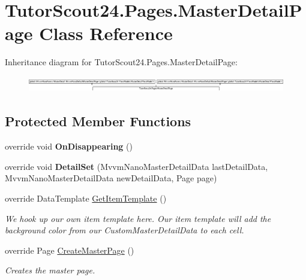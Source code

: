 \hypertarget{class_tutor_scout24_1_1_pages_1_1_master_detail_page}{}\section{Tutor\+Scout24.\+Pages.\+Master\+Detail\+Page Class Reference}
\label{class_tutor_scout24_1_1_pages_1_1_master_detail_page}
Inheritance diagram for Tutor\+Scout24.\+Pages.\+Master\+Detail\+Page\+:\begin{figure}[H]
\begin{center}
\leavevmode
\includegraphics[height=0.703518cm]{class_tutor_scout24_1_1_pages_1_1_master_detail_page}
\end{center}
\end{figure}
\subsection*{Protected Member Functions}
\begin{DoxyCompactItemize}
\item 
\mbox{\label{class_tutor_scout24_1_1_pages_1_1_master_detail_page_a5edd3374a2eccfd6124e8ccea02fa3d0}} 
override void {\bfseries On\+Disappearing} ()
\item 
\mbox{\label{class_tutor_scout24_1_1_pages_1_1_master_detail_page_a7179814d33abbf5921b89753fad86fb6}} 
override void {\bfseries Detail\+Set} (Mvvm\+Nano\+Master\+Detail\+Data last\+Detail\+Data, Mvvm\+Nano\+Master\+Detail\+Data new\+Detail\+Data, Page page)
\item 
override Data\+Template \mbox{\hyperlink{class_tutor_scout24_1_1_pages_1_1_master_detail_page_a6ebda80b9ad528567f371f72c249489a}{Get\+Item\+Template}} ()
\begin{DoxyCompactList}\small\item\em We hook up our own item template here. Our item template will add the background color from our Custom\+Master\+Detail\+Data to each cell. \end{DoxyCompactList}\item 
override Page \mbox{\hyperlink{class_tutor_scout24_1_1_pages_1_1_master_detail_page_aee08fdc730be0be9f8fdcdbc16eaad9f}{Create\+Master\+Page}} ()
\begin{DoxyCompactList}\small\item\em Creates the master page. \end{DoxyCompactList}\end{DoxyCompactItemize}


